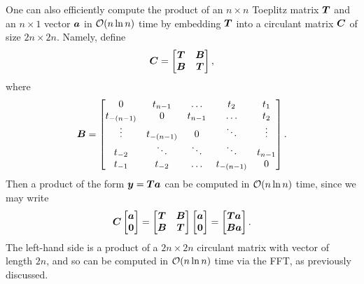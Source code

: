 One can also efficiently compute the product of an \(n \times n\) Toeplitz matrix \(\boldsymbol{T}\) and an \(n \times 1\) vector \(\boldsymbol{a}\) in \(\mathcal{O}(n \ln n)\) time by embedding \(\boldsymbol{T}\) into a circulant matrix \(\boldsymbol{C}\) of size \(2n \times 2n\). Namely, define
\begin{equation*}
	\boldsymbol{C} =
	\begin{bmatrix}
		\boldsymbol{T} & \boldsymbol{B} \\
		\boldsymbol{B} & \boldsymbol{T}
	\end{bmatrix},
\end{equation*}
where
\begin{equation*}
	\boldsymbol{B} =
	\begin{bmatrix}
		0          & t_{n-1}    & \dots   & t_2        & t_1     \\
		t_{-(n-1)} & 0          & t_{n-1} & \dots      & t_2     \\
		\vdots     & t_{-(n-1)} & 0       & \ddots     & \vdots  \\
		t_{-2}     & \ddots     & \ddots  & \ddots     & t_{n-1} \\
		t_{-1}     & t_{-2}     & \dots   & t_{-(n-1)} & 0
	\end{bmatrix}.
\end{equation*}
Then a product of the form \(\boldsymbol{y} = \boldsymbol{Ta}\) can be computed in \(\mathcal{O}(n \ln n)\) time, since we may write
\begin{equation*}
	\boldsymbol{C}
	\begin{bmatrix}
		\boldsymbol{a} \\ \boldsymbol{0}
	\end{bmatrix}
	=
	\begin{bmatrix}
		\boldsymbol{T} & \boldsymbol{B} \\
		\boldsymbol{B} & \boldsymbol{T}
	\end{bmatrix}
	\begin{bmatrix}
		\boldsymbol{a} \\ \boldsymbol{0}
	\end{bmatrix}
	=
	\begin{bmatrix}
		\boldsymbol{Ta} \\ \boldsymbol{Ba}
	\end{bmatrix}.
\end{equation*}
The left-hand side is a product of a \(2n \times 2n\) circulant matrix with vector of length \(2n\), and so can be computed in \(\mathcal{O}(n \ln n)\) time via the FFT, as previously discussed.

